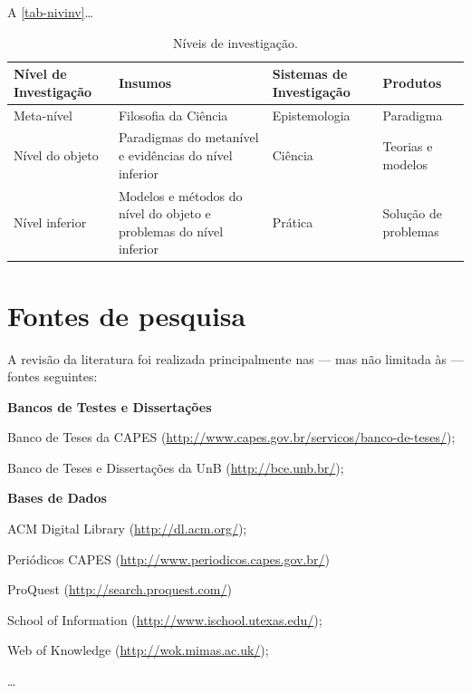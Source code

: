 A \autoref{tab-nivinv}\ldots

\begin{table}[htb]
\footnotesize
\caption[Níveis de investigação]{\footnotesize{Níveis de investigação.
\cite{van86}}}
\label{tab-nivinv}
\begin{tabular}{p{2.6cm}|p{6.0cm}|p{2.25cm}|p{3.40cm}}
   \textbf{Nível de Investigação} & \textbf{Insumos}  & \textbf{Sistemas de Investigação}  & \textbf{Produtos}  \\
    \hline
    Meta-nível & Filosofia da Ciência  & Epistemologia & Paradigma  \\
    \hline
    Nível do objeto & Paradigmas do metanível e evidências do nível inferior &
    Ciência  & Teorias e modelos \\
    \hline
    Nível inferior & Modelos e métodos do nível do objeto e problemas do nível inferior & Prática & Solução de problemas  \\
\end{tabular}
\end{table}


\section{Fontes de pesquisa} \label{metodologiaFontes}

A revisão da literatura foi realizada principalmente nas --- mas não limitada às
--- fontes seguintes:

\textbf{Bancos de Testes e Dissertações}

\begin{list}{--}{}
  \item Banco de Teses da CAPES (\url{http://www.capes.gov.br/servicos/banco-de-teses/});
  \item Banco de Teses e Dissertações da UnB (\url{http://bce.unb.br/});
\end{list}

\textbf{Bases de Dados}

\begin{list}{--}{}
  \item ACM Digital Library (\url{http://dl.acm.org/});
  \item Periódicos CAPES (\url{http://www.periodicos.capes.gov.br/})
  \item ProQuest (\url{http://search.proquest.com/})
  \item School of Information (\url{http://www.ischool.utexas.edu/});
  \item Web of Knowledge (\url{http://wok.mimas.ac.uk/});
  \item \ldots
\end{list}

